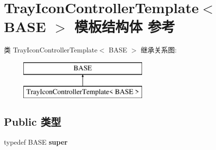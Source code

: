 \hypertarget{struct_tray_icon_controller_template}{}\section{Tray\+Icon\+Controller\+Template$<$ B\+A\+SE $>$ 模板结构体 参考}
\label{struct_tray_icon_controller_template}
类 Tray\+Icon\+Controller\+Template$<$ B\+A\+SE $>$ 继承关系图\+:\begin{figure}[H]
\begin{center}
\leavevmode
\includegraphics[height=2.000000cm]{struct_tray_icon_controller_template}
\end{center}
\end{figure}
\subsection*{Public 类型}
\begin{DoxyCompactItemize}
\item 
\mbox{\label{struct_tray_icon_controller_template_aa874a5c1c3cf7ad0c401eef5c4fa894c}} 
typedef B\+A\+SE {\bfseries super}
\end{DoxyCompactItemize}
